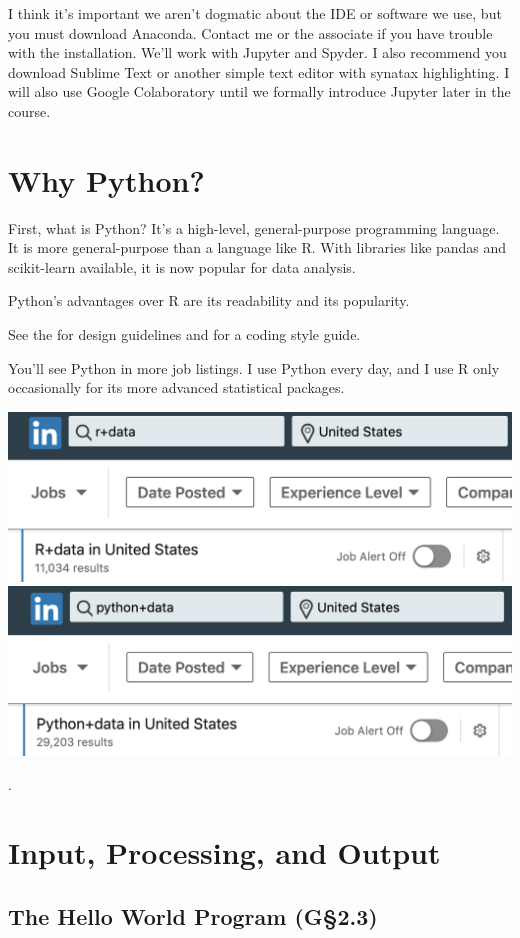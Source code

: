 I think it's important we aren't dogmatic about the IDE or software we use, but you must download Anaconda. Contact me or the associate if you have trouble with the installation.
We'll work with Jupyter and Spyder. I also recommend you download Sublime Text or another simple text editor with synatax highlighting.
I will also use Google Colaboratory until we formally introduce Jupyter later in the course. 


\section{Why Python?}

First, what is Python? It's a high-level, general-purpose programming language. 
It is more general-purpose than a language like R. 
With libraries like pandas and scikit-learn available, it is now popular for data analysis.

Python's advantages over R are its readability and its popularity.

See the  for design guidelines and  for a coding style guide.

You'll see Python in more job listings. I use Python every day, and I use R only occasionally for its more advanced statistical packages.

\begin{center}
\includegraphics[width = .45\textwidth]{R_data_linkedin.png} \includegraphics[width = .45\textwidth]{Python_data_linkedin.png}
\end{center}

\faMicrophone \faEyedropper.

\section{Input, Processing, and Output}


\subsection{The Hello World Program (G\S 2.3)}

